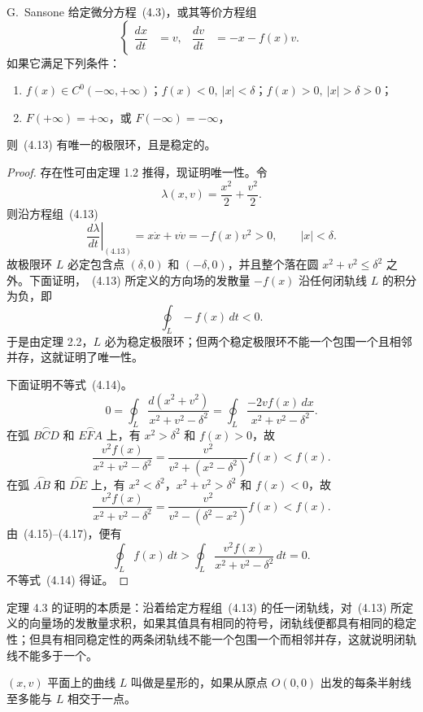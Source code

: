 \begin{theorem}{G.~Sansone}{ }
给定微分方程~(4.3)，或其等价方程组
\[
\left\{
\begin{aligned}
\dfrac{dx}{dt}&=v, &\dfrac{dv}{dt}&=-x-f(x)v.
\end{aligned}\right. \tag{4.13}
\]
如果它满足下列条件：
\begin{enumerate}
\item $f(x)\in C^0(-\infty,+\infty)$；$f(x)<0,\ |x|<\delta$；$f(x)>0,\ |x|>\delta>0$；
\item $F(+\infty)=+\infty$，或 $F(-\infty)=-\infty$，
\end{enumerate}
则~(4.13) 有唯一的极限环，且是稳定的。
\end{theorem}

\begin{proof}
存在性可由定理 1.2 推得，现证明唯一性。令
\[
\lambda(x,v)=\dfrac{x^2}{2}+\dfrac{v^2}{2}.
\]
则沿方程组~(4.13)
\[
\left.\dfrac{d\lambda}{dt}\right|_{(4.13)}=x\dot{x}+v\dot{v}=-f(x)v^2>0,\qquad |x|<\delta.
\]
故极限环 $L$ 必定包含点 $(\delta,0)$ 和 $(-\delta,0)$，并且整个落在圆
$x^2+v^2\leq\delta^2$ 之外。下面证明，~(4.13) 所定义的方向场的发散量 $-f(x)$ 沿任何闭轨线 $L$ 的积分为负，即
\[
\oint_L-f(x)\,dt<0. \tag{4.14}
\]
于是由定理 2.2，$L$ 必为稳定极限环；但两个稳定极限环不能一个包围一个且相邻并存，这就证明了唯一性。

下面证明不等式~(4.14)。
\[
0=\oint_L\dfrac{d(x^2+v^2)}{x^2+v^2-\delta^2}
=\oint_L\dfrac{-2vf(x)\,dx}{x^2+v^2-\delta^2}. \tag{4.15}
\]
在弧 $\overset{\frown}{BCD}$ 和 $\overset{\frown}{EFA}$ 上，有 $x^2>\delta^2$ 和 $f(x)>0$，故
\[
\dfrac{v^2f(x)}{x^2+v^2-\delta^2}
=\dfrac{v^2}{v^2+(x^2-\delta^2)}f(x)<f(x). \tag{4.16}
\]
在弧 $\overset{\frown}{AB}$ 和 $\overset{\frown}{DE}$ 上，有 $x^2<\delta^2$，$x^2+v^2>\delta^2$ 和 $f(x)<0$，故
\[
\dfrac{v^2f(x)}{x^2+v^2-\delta^2}
=\dfrac{v^2}{v^2-(\delta^2-x^2)}f(x)<f(x). \tag{4.17}
\]
由~(4.15)--(4.17)，便有
\[
\oint_Lf(x)\,dt>
\oint_L\dfrac{v^2f(x)}{x^2+v^2-\delta^2}\,dt
=0.
\]
不等式~(4.14) 得证。
\end{proof}

定理 4.3 的证明的本质是：沿着给定方程组~(4.13) 的任一闭轨线，对~(4.13) 所定义的向量场的发散量求积，如果其值具有相同的符号，闭轨线便都具有相同的稳定性；但具有相同稳定性的两条闭轨线不能一个包围一个而相邻并存，这就说明闭轨线不能多于一个。

\begin{definition}{}{ }
$(x,v)$ 平面上的曲线 $L$ 叫做是星形的，如果从原点 $O(0,0)$ 出发的每条半射线至多能与 $L$ 相交于一点。
\end{definition}

